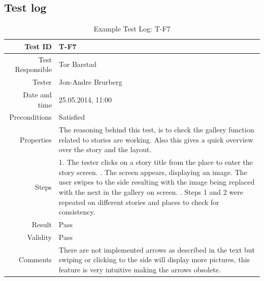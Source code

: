 \documentclass[12pt,a4paper,titlepage]{article}
\begin{document}
\newpage
\pagestyle{plain}
\begin{appendices}



\section{Test log}
\label{sec:TestLog}

\begin{table}[!htp]
\begin{center}
\begin{tabularx}{\textwidth}{|r| X|} \toprule
Test ID & T-F7 \\ \hline
Test Responsible & Tor Barstad	\\ \hline
Tester & Jon-Andre Brurberg	\\ \hline
Date and time & 25.05.2014, 11:00			\\ \hline
Preconditions& Satisfied			\\ \hline
Properties & The reasoning behind this test, is to check the gallery function related to stories are working. Also this gives a quick overview over the story and the layout.\\ \hline
Steps &	1. The tester clicks on a story title from the place to enter the story screen. \newline
		2. The screen appears, displaying an image. The user swipes to the side resulting  with the image being replaced with the next in the gallery on screen. \newline
		3. Steps 1 and 2 were repeated on different stories and places to check for consistency.
	 \\ \hline 
Result & Pass \\ \hline
Validity & Pass\\ \hline
Comments&  There are not implemented arrows as described in the text but swiping or clicking to the side will display more pictures, this feature is very intuitive making the arrows obsolete.\\ \hline
\end{tabularx}
\caption{Example Test Log: T-F7}
\end{center}
\end{table}


\end{appendices}
\end{document}
